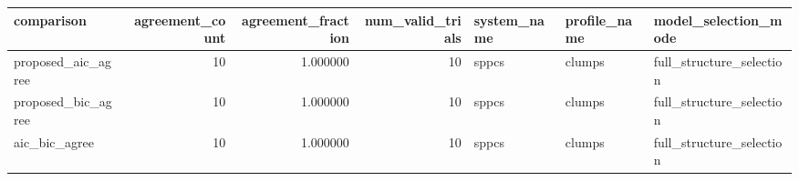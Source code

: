 \begin{tabular}{lrrrlll}
\toprule
comparison & agreement_count & agreement_fraction & num_valid_trials & system_name & profile_name & model_selection_mode \\
\midrule
proposed_aic_agree & 10 & 1.000000 & 10 & sppcs & clumps & full_structure_selection \\
proposed_bic_agree & 10 & 1.000000 & 10 & sppcs & clumps & full_structure_selection \\
aic_bic_agree & 10 & 1.000000 & 10 & sppcs & clumps & full_structure_selection \\
\bottomrule
\end{tabular}
